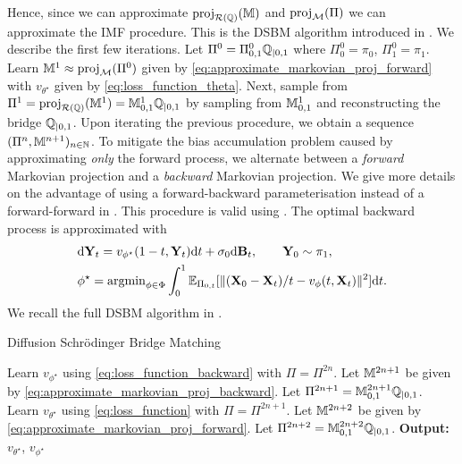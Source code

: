 \documentclass{article}
\begin{document}
Hence, since we can approximate $\mathrm{proj}_{\mathcal{R}(\mathbb{Q})}(\mathbb{M})$ and $\mathrm{proj}_{\mathcal{M}}(\Pi)$ we can approximate the IMF procedure. This is the DSBM algorithm introduced in \cite{shi2023DSBM,peluchetti_diffusion_2023}. We describe the first few iterations. 
Let $\Pi^0=   \Pi_{0,1}^0 \mathbb{Q}_{|0,1}$ where
$\Pi^0_0 = \pi_0$, $\Pi^0_1 = \pi_1$. 
Learn $\mathbb{M}^1 \approx \mathrm{proj}_{\mathcal{M}}(\Pi^0)$ given by
\eqref{eq:approximate_markovian_proj_forward} with $v_{\theta^\star}$ given by 
\eqref{eq:loss_function_theta}.  Next, sample from $\Pi^1 = \mathrm{proj}_{\mathcal{R}(\mathbb{Q})}(\mathbb{M}^1)= \mathbb{M}^1_{0,1} \mathbb{Q}_{|0,1}$ by
sampling from $\mathbb{M}^1_{0,1}$ and reconstructing the bridge $\mathbb{Q}_{|0,1}$. 
Upon iterating the previous procedure, we obtain a sequence $(\Pi^n,\mathbb{M}^{n+1})_{n \in \mathbb{N}}$. To mitigate the bias accumulation problem caused by approximating \emph{only} the forward process, we alternate between a \emph{forward} Markovian
projection and a \emph{backward} Markovian projection. We give more details on the advantage of using a forward-backward parameterisation instead of a forward-forward in .  This procedure is
valid using \cite[Proposition 9]{shi2023DSBM}. The optimal backward process is approximated with
\begin{align}
&  \label{eq:approximate_markovian_proj_backward}
  \rmd \bfY_t = v_{\phi^\star}(1-t, \bfY_t) \rmd t + \sigma_0 \rmd \bfB_t , \qquad \bfY_0 \sim \pi_1 , \\ 
  \label{eq:loss_function_backward}
 &  \phi^\star = \argmin_{\phi \in \Phi} \int_0^1 \expeLigne{\Pi_{0,t}}{\normLigne{(\bfX_0 - \bfX_t)/t - v_\phi(t,\bfX_t)}^2}  \rmd t.
\end{align}
We recall the full DSBM algorithm in .

\begin{algorithm}[H]
\caption{Diffusion Schr\"odinger Bridge Matching}
\label{alg:DSBM_general}
\begin{algorithmic}[1]
  \STATE Learn $v_{\phi^\star}$ using \eqref{eq:loss_function_backward} with $\Pi = \Pi^{2n}$. 
  \STATE Let $\mathbb{M}^{2n+1}$ be given by \eqref{eq:approximate_markovian_proj_backward}. 
  \STATE Let $\Pi^{2n+1} = \mathbb{M}^{2n+1}_{0,1} \mathbb{Q}_{|0,1}$.
  \STATE Learn $v_{\theta^\star}$ using \eqref{eq:loss_function} with $\Pi = \Pi^{2n+1}$. 
  \STATE Let $\mathbb{M}^{2n+2}$ be given by \eqref{eq:approximate_markovian_proj_forward}. 
  \STATE Let $\Pi^{2n+2} = \mathbb{M}^{2n+2}_{0,1} \mathbb{Q}_{|0,1}$.
  \ENDFOR
  \STATE \textbf{Output:} $v_{\theta^\star}$, $v_{\phi^\star}$
\end{algorithmic}
\end{algorithm}
\end{document}
